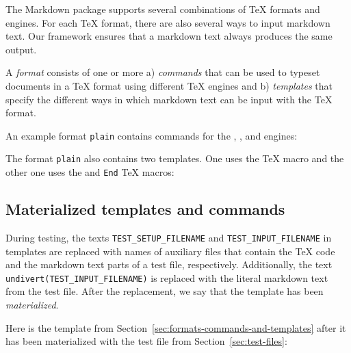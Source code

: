 \documentclass[final]{ltugboat}
\begin{document}
The Markdown package supports several combinations of \TeX{} formats and engines. For each \TeX{} format, there are also several ways to input markdown text. Our framework ensures that a markdown text always produces the same output.

A \emph{format} consists of one or more a) \emph{commands} that can be used to typeset documents in a \TeX{} format using different \TeX{} engines and b) \emph{templates} that specify the different ways in which markdown text can be input with the \TeX{} format.

An example format \texttt{plain} contains commands for the , , and  engines:

\smallskip
\noindent
\addtocounter{footnote}{1}%
%

\smallskip
\noindent
The format \texttt{plain} also contains two templates. One uses the  \TeX{} macro and the other one uses the  and \texttt{End} \TeX{} macros:

\medskip
\noindent
{}

\medskip
\exampleSeparator

\medskip
\noindent
{}

\subsection{Materialized templates and commands}
\label{sec:materialized-templates-and-commands}

During testing, the texts \texttt{TEST\_SETUP\_FILENAME} and \texttt{TEST\_INPUT\_FILENAME} in templates are replaced with names of auxiliary files that contain the \TeX{} code and the markdown text parts of a test file, respectively. Additionally, the text {\small\texttt{undivert(TEST\_INPUT\_FILENAME)}} is replaced with the literal markdown text from the test file. After the replacement, we say that the template has been \emph{materialized}.

Here is the template  from Section~\ref{sec:formats-commands-and-templates} after it has been materialized with the test file  from Section~\ref{sec:test-files}:
\end{document}
